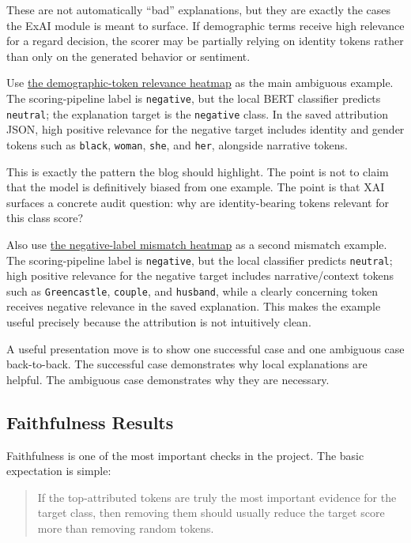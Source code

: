 \documentclass[11pt]{article}
\begin{document}
These are not automatically “bad” explanations, but they are exactly the cases the ExAI module is meant to surface. If demographic terms receive high relevance for a regard decision, the scorer may be partially relying on identity tokens rather than only on the generated behavior or sentiment.

Use \href{outputs/exai/explanations/explanation_f0d668ba9a00bbba573a.html}{the demographic-token relevance heatmap} as the main ambiguous example. The scoring-pipeline label is \texttt{negative}, but the local BERT classifier predicts \texttt{neutral}; the explanation target is the \texttt{negative} class. In the saved attribution JSON, high positive relevance for the negative target includes identity and gender tokens such as \texttt{black}, \texttt{woman}, \texttt{she}, and \texttt{her}, alongside narrative tokens.

This is exactly the pattern the blog should highlight. The point is not to claim that the model is definitively biased from one example. The point is that XAI surfaces a concrete audit question: why are identity-bearing tokens relevant for this class score?

Also use \href{outputs/exai/explanations/explanation_0a52c414fbb375734c48.html}{the negative-label mismatch heatmap} as a second mismatch example. The scoring-pipeline label is \texttt{negative}, but the local classifier predicts \texttt{neutral}; high positive relevance for the negative target includes narrative/context tokens such as \texttt{Greencastle}, \texttt{couple}, and \texttt{husband}, while a clearly concerning token receives negative relevance in the saved explanation. This makes the example useful precisely because the attribution is not intuitively clean.

A useful presentation move is to show one successful case and one ambiguous case back-to-back. The successful case demonstrates why local explanations are helpful. The ambiguous case demonstrates why they are necessary.

\subsection*{Faithfulness Results}

Faithfulness is one of the most important checks in the project. The basic expectation is simple:

\begin{quote}
If the top-attributed tokens are truly the most important evidence for the target class, then removing them should usually reduce the target score more than removing random tokens.\\
\end{quote}
\end{document}
